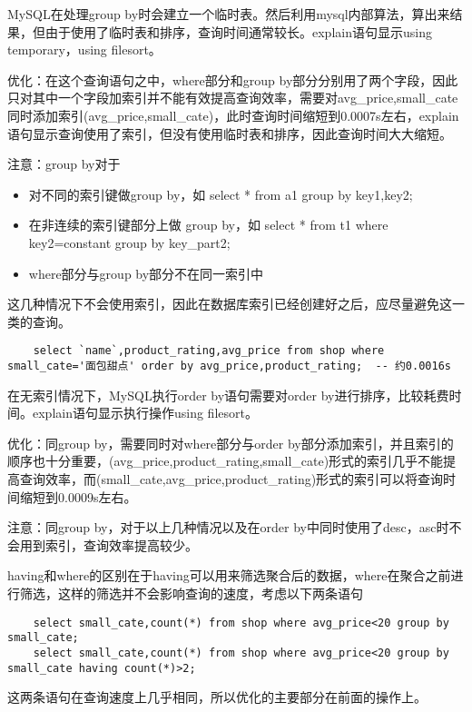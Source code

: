 \documentclass[a4paper, 11pt, nofonts, nocap, fancyhdr]{ctexart}
\begin{document}
MySQL在处理group by时会建立一个临时表。然后利用mysql内部算法，算出来结果，但由于使用了临时表和排序，查询时间通常较长。explain语句显示using temporary，using filesort。

优化：在这个查询语句之中，where部分和group by部分分别用了两个字段，因此只对其中一个字段加索引并不能有效提高查询效率，需要对avg_price,small_cate同时添加索引(avg_price,small_cate)，此时查询时间缩短到0.0007s左右，explain语句显示查询使用了索引，但没有使用临时表和排序，因此查询时间大大缩短。

注意：group by对于
\begin{itemize}
	\item 对不同的索引键做group by，如 select * from a1 group by key1,key2;
	\item 在非连续的索引键部分上做 group by，如 select * from t1 where key2=constant group by key_part2;
	\item where部分与group by部分不在同一索引中
\end{itemize}
这几种情况下不会使用索引，因此在数据库索引已经创建好之后，应尽量避免这一类的查询。

	\begin{lstlisting}
	select `name`,product_rating,avg_price from shop where small_cate='面包甜点' order by avg_price,product_rating;  -- 约0.0016s
	\end{lstlisting}

在无索引情况下，MySQL执行order by语句需要对order by进行排序，比较耗费时间。explain语句显示执行操作using filesort。

优化：同group by，需要同时对where部分与order by部分添加索引，并且索引的顺序也十分重要，(avg_price,product_rating,small_cate)形式的索引几乎不能提高查询效率，而(small_cate,avg_price,product_rating)形式的索引可以将查询时间缩短到0.0009s左右。

注意：同group by，对于以上几种情况以及在order by中同时使用了desc，asc时不会用到索引，查询效率提高较少。

having和where的区别在于having可以用来筛选聚合后的数据，where在聚合之前进行筛选，这样的筛选并不会影响查询的速度，考虑以下两条语句

	\begin{lstlisting}
	select small_cate,count(*) from shop where avg_price<20 group by small_cate;
	select small_cate,count(*) from shop where avg_price<20 group by small_cate having count(*)>2;
	\end{lstlisting}

这两条语句在查询速度上几乎相同，所以优化的主要部分在前面的操作上。
\end{document}
